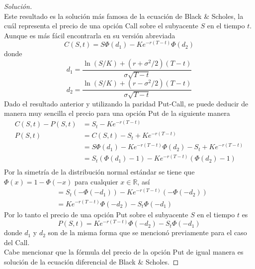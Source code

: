\documentclass[11pt,notitlepage]{article}
\newenvironment{solucion}
  {\begin{proof}[Solución]}
  {\end{proof}}
\begin{document}
\begin{solucion}
\begin{equation*}
    \end{equation*}
    Este resultado es la solución más famosa de la ecuación de Black \& Scholes, la cuál representa el precio de una opción Call sobre el subyacente $S$ en el tiempo $t$.\\
    Aunque es más fácil encontrarla en su versión abreviada 
    \begin{equation*}
        C(S,t) = S \Phi(d_1) - K e^{-r(T-t)}\Phi(d_2)
    \end{equation*}
    donde
    \begin{equation*}
        d_1 = \frac{\ln{(S/K)} + (r + \sigma^2/2)(T-t)}{\sigma\sqrt{T-t}}
    \end{equation*}
    \begin{equation*}
        d_2 = \frac{\ln{(S/K)} + (r - \sigma^2/2)(T-t)}{\sigma\sqrt{T-t}}
    \end{equation*}
    Dado el resultado anterior y utilizando la paridad Put-Call, se puede deducir de manera muy sencilla el precio para una opción Put de la siguiente manera
    \begin{align*}
        C(S,t) - P(S,t) &= S_t - Ke^{-r(T-t)}\\
        P(S,t) &= C(S,t) - S_t + Ke^{-r(T-t)}\\
        &= S \Phi(d_1) - K e^{-r(T-t)}\Phi(d_2) - S_t + Ke^{-r(T-t)}\\
        &= S_t(\Phi(d_1) - 1) - Ke^{-r(T-t)}(\Phi(d_2) - 1)\\
    \end{align*}
    Por la simetría de la distribución normal estándar se tiene que  $\Phi(x) = 1 - \Phi(-x)$ para cualquier $x \in \mathbb{R}$, así
    \begin{align*}
        &= S_t(-\Phi(-d_1)) - Ke^{-r(T-t)}(-\Phi(-d_2))\\
        &= Ke^{-r(T-t)}\Phi(-d_2) - S_t\Phi(-d_1)
    \end{align*}
    Por lo tanto el precio de una opción Put sobre el subyacente $S$ en el tiempo $t$ es
    \begin{equation*}
        P(S,t) = Ke^{-r(T-t)}\Phi(-d_2) - S_t\Phi(-d_1)
    \end{equation*}
    donde $d_1$ y $d_2$ son de la misma forma que se mencionó previamente para el caso del Call.\\
    Cabe mencionar que la fórmula del precio de la opción Put de igual manera es solución de la ecuación diferencial de Black \& Scholes.
\end{solucion}
\end{document}
